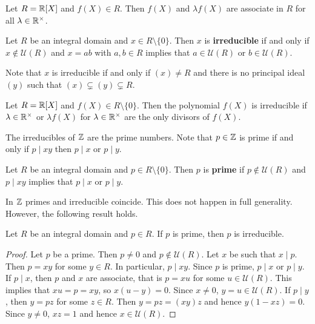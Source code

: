 \begin{example}
	Let $R=\mathbb{R}[X]$ and $f(X)\in R$. Then $f(X)$ and $\lambda f(X)$ are 
	associate in $R$ for all $\lambda\in\mathbb{R}^{\times}$. 	
\end{example}

\begin{definition}
	Let $R$ be an integral domain and $x\in R\setminus\{0\}$. Then $x$ is \textbf{irreducible} 
	if and only if $x\not\in\mathcal{U}(R)$ 
	and $x=ab$ with $a,b\in R$ implies that $a\in\mathcal{U}(R)$ or $b\in\mathcal{U}(R)$. 
\end{definition}

Note that $x$ is irreducible if and only if $(x)\ne R$ 
and there is no principal ideal $(y)$ such that 
$(x)\subsetneq (y)\subsetneq R$.

\begin{example}
	Let $R=\mathbb{R}[X]$ and $f(X)\in R\setminus\{0\}$. Then the polynomial $f(X)$ is irreducible if 
	$\lambda\in\mathbb{R}^{\times}$ or $\lambda f(X)$ for $\lambda\in\mathbb{R}^{\times}$ 
	are the only divisors
	of $f(X)$.  
\end{example}

The irreducibles of $\mathbb{Z}$ are the prime numbers. Note that $p\in \mathbb{Z}$
is prime if and only if $p\mid xy$ then $p\mid x$ or $p\mid y$. 

\begin{definition}
	Let $R$ be an integral domain and $p\in R\setminus\{0\}$. Then  
	$p$ is \textbf{prime} if $p\not\in\mathcal{U}(R)$ and 
	$p\mid xy$ implies that $p\mid x$ or $p\mid y$. 
\end{definition}

In $\mathbb{Z}$ primes and irreducible coincide. 
This does not happen in full generality. However,
the following result holds. 

\begin{proposition}
	Let $R$ be an integral domain and $p\in R$. 
	If $p$ is prime, then $p$ is irreducible. 
\end{proposition}

\begin{proof}
	Let $p$ be a prime. Then $p\ne 0$ and $p\not\in\mathcal{U}(R)$. Let $x$ be such that
	$x\mid p$. Then $p=xy$ for some $y\in R$. In particular, $p\mid xy$. 
	Since $p$ is prime, $p\mid x$ or $p\mid y$. If $p\mid x$, then
	$p$ and $x$ are associate, that is $p=xu$ for some $u\in\mathcal{U}(R)$.
	This implies that $xu=p=xy$, so $x(u-y)=0$. Since $x\ne 0$, 
	$y=u\in\mathcal{U}(R)$. 
	If $p\mid y$, then $y=pz$ for some $z\in R$. Then
	$y=pz=(xy)z$ and hence $y(1-xz)=0$. Since $y\ne 0$, 
	$xz=1$ and hence $x\in\mathcal{U}(R)$. 
\end{proof}


